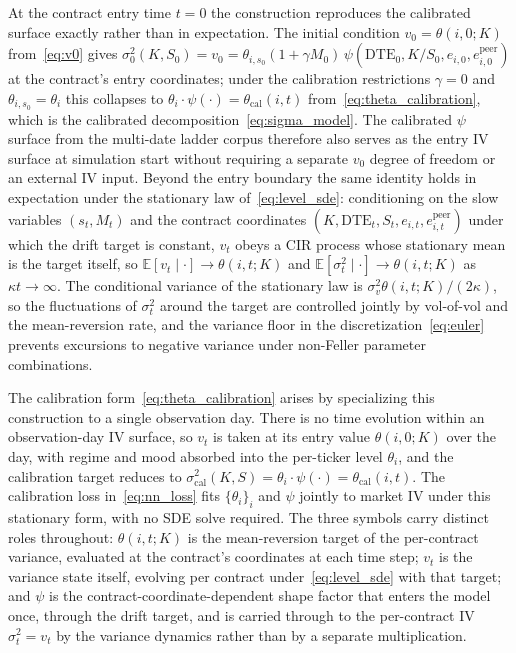At the contract entry time $t = 0$ the construction reproduces the calibrated surface exactly rather than in expectation. The initial condition $v_0 = \theta(i,0;K)$ from~\eqref{eq:v0} gives $\sigma_0^2(K, S_0) = v_0 = \theta_{i,s_0}(1+\gamma M_0)\,\psi(\mathrm{DTE}_0, K/S_0, e_{i,0}, e^{\text{peer}}_{i,0})$ at the contract's entry coordinates; under the calibration restrictions $\gamma = 0$ and $\theta_{i,s_0} = \theta_i$ this collapses to $\theta_i \cdot \psi(\cdot) = \theta_{\text{cal}}(i,t)$ from~\eqref{eq:theta_calibration}, which is the calibrated decomposition~\eqref{eq:sigma_model}. The calibrated $\psi$ surface from the multi-date ladder corpus therefore also serves as the entry IV surface at simulation start without requiring a separate $v_0$ degree of freedom or an external IV input. Beyond the entry boundary the same identity holds in expectation under the stationary law of~\eqref{eq:level_sde}: conditioning on the slow variables $(s_t, M_t)$ and the contract coordinates $(K, \mathrm{DTE}_t, S_t, e_{i,t}, e^{\text{peer}}_{i,t})$ under which the drift target is constant, $v_t$ obeys a CIR process whose stationary mean is the target itself, so $\mathbb{E}[v_t \mid \cdot] \to \theta(i,t;K)$ and $\mathbb{E}[\sigma_t^2 \mid \cdot] \to \theta(i,t;K)$ as $\kappa t \to \infty$. The conditional variance of the stationary law is $\sigma_v^2 \theta(i,t;K) / (2\kappa)$, so the fluctuations of $\sigma_t^2$ around the target are controlled jointly by vol-of-vol and the mean-reversion rate, and the variance floor in the discretization~\eqref{eq:euler} prevents excursions to negative variance under non-Feller parameter combinations.

The calibration form~\eqref{eq:theta_calibration} arises by specializing this construction to a single observation day. There is no time evolution within an observation-day IV surface, so $v_t$ is taken at its entry value $\theta(i,0;K)$ over the day, with regime and mood absorbed into the per-ticker level $\theta_i$, and the calibration target reduces to $\sigma_{\text{cal}}^2(K, S) = \theta_i \cdot \psi(\cdot) = \theta_{\text{cal}}(i,t)$. The calibration loss in~\eqref{eq:nn_loss} fits $\{\theta_i\}_i$ and $\psi$ jointly to market IV under this stationary form, with no SDE solve required. The three symbols carry distinct roles throughout: $\theta(i,t;K)$ is the mean-reversion target of the per-contract variance, evaluated at the contract's coordinates at each time step; $v_t$ is the variance state itself, evolving per contract under~\eqref{eq:level_sde} with that target; and $\psi$ is the contract-coordinate-dependent shape factor that enters the model once, through the drift target, and is carried through to the per-contract IV $\sigma_t^2 = v_t$ by the variance dynamics rather than by a separate multiplication.

